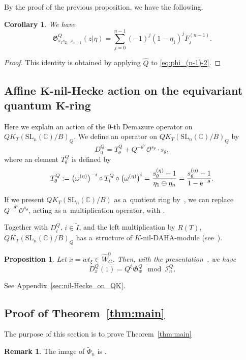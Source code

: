 \documentclass[pdftex]{sigma}
\numberwithin{equation}{section}
\newcommand{\C}{\mathbb{C}}
\newcommand{\Gro}[1]{\mathfrak{G}^Q_{#1}}
\newcommand{\Iaf}{\tilde{I}}
\newcommand{\Rep}{{R(T)}}
\newcommand{\SL}{\mathrm{SL}}
\newtheorem{Corollary}[Theorem]{Corollary}
\newtheorem{Proposition}[Theorem]{Proposition}
\theoremstyle{definition}
\newtheorem{Remark}[Theorem]{Remark}
\begin{document}
By the proof of the previous
proposition, we have the following.
\begin{Corollary}\label{cor:phi_(n-1)}
We have
\[
\Gro{s_1s_2\dots s_{n-1}}(z|\eta)=
\sum_{j=0}^{n-1}(-1)^j(1-\eta_{1})^{j}F_j^{(n-1)}.
\]
\end{Corollary}
\begin{proof} This identity is obtained by
applying $\hat{Q}$ to
\eqref{eq:phi_(n-1)-2}.
\end{proof}





\subsection[Affine K-nil-Hecke action on the equivariant quantum K-ring]{Affine $\boldsymbol{K}$-nil-Hecke action on the equivariant quantum $\boldsymbol{K}$-ring}
Here we explain an action of
the $0$-th Demazure operator on
$QK_T(\SL_n(\C)/B)_Q$.
We define an operator  on
$QK_T(\SL_n(\C)/B)_Q$ by
\begin{equation}
\label{eq:D0Q}
D_0^Q=T^{Q}_{\theta}+
Q^{-\theta^\vee}
\mathscr{O}^{s_\theta}\cdot
s_\theta,
\end{equation}
where an element $T^Q_\theta$ is defined by
\[
T^Q_\theta:=\bigl(\omega^{(\eta)}\bigr)^{-i}\circ T^Q_i\circ \bigl(\omega^{(\eta)}\bigr)^i=\frac{s_\theta^{(\eta)}-1}{\eta_1\ominus\eta_n}=\frac{s^{(\eta)}_\theta-1}{1-{\rm e}^{-\theta}}.
\]

If we present $QK_T(\SL_n(\C)/B)$ as a~quotient ring by~\cite{MNS1}, we can replace
$Q^{-\theta^\vee}\mathscr{O}^{s_\theta}$, acting as a~multiplication operator,
with \smash{$Q^{-\theta^\vee}\Gro{s_\theta}$}.

Together with $D_i^Q$, $i\in \Iaf$, and the left multiplication by $R(T)$,
 $QK_T(\SL_n(\C)/B)_Q$ has a~structure of $K$-nil-DAHA-module (see~\cite{KNS,KoNOS,Orr}).


\begin{Proposition}\label{prop:Quantum_D(1)}
Let $x=wt_\xi\in \hat{W}_G^0$. Then, with the presentation~{\rm\cite{MNS1}}, we have
\[%
D_x^Q(1)
=Q^\xi \Gro{w} \mod \mathscr{I}_n^Q.
\]
\end{Proposition}
See Appendix~\ref{sec:nil-Hecke_on_QK}.


\subsection{Proof of Theorem~\ref{thm:main}}
The purpose of this section is to prove Theorem~\ref{thm:main}
\begin{Remark}
The image of $\tilde{\Phi}_n$ is \smash{$\hat{\Lambda}_{(n)}^\Rep\big[\sigma_i^{-1},(\sigma(\sigma_i))^{-1}|1\leq i\leq n\big]$}.
\end{Remark}
\end{document}
